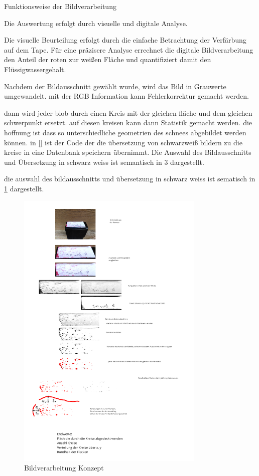 Funktionsweise der Bildverarbeitung


Die Auswertung erfolgt durch visuelle und digitale Analyse.

Die visuelle Beurteilung erfolgt durch die einfache Betrachtung der Verfärbung auf dem Tape. 
Für eine präzisere Analyse errechnet die digitale Bildverarbeitung den Anteil der roten zur weißen Fläche und quantifiziert damit den Flüssigwassergehalt.

Nachdem der Bildausschnitt gewählt wurde, wird das Bild in Grauwerte umgewandelt. mit der RGB Information kann Fehlerkorrektur gemacht werden.

dann wird jeder blob durch einen Kreis mit der gleichen fläche und dem gleichen schwerpunkt ersetzt. auf diesen kreisen kann dann Statistik gemacht werden. die hoffnung ist dass so unterschiedliche geometrien des schnees abgebildet werden können. in \ref{} ist der Code der die übersetzung von schwarzweiß bildern zu die kreise in eine Datenbank speichern übernimmt.
Die Auswahl des Bildausschnitts und Übersetzung in schwarz weiss ist semantisch in 3 dargestellt.



die auswahl des bildausschnitts und übersetzung in schwarz weiss ist sematisch in \ref{fig:Bildverarbeitnugskonzpet} dargestellt.


\begin{figure}
    \centering
    \includegraphics[width=0.8\textwidth]{Bilder/Screenshotfrom2024-04-0112-59-42.png}
    \caption{Bildverarbeitung Konzept}
    \label{fig:Bildverarbeitnugskonzpet}
\end{figure}

\newpage
